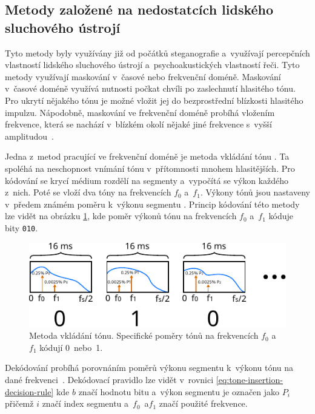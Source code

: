 \subsection*{Metody založené na nedostatcích lidského sluchového ústrojí}
\label{sub:has}

Tyto metody byly využívány již od počátků steganografie a~využívají percepčních
vlastností lidského sluchového ústrojí a~psychoakustických vlastností řeči.
Tyto metody využívají maskování v~časové nebo frekvenční doméně. Maskování
v~časové doméně využívá nutnosti počkat chvíli po zaslechnutí hlasitého tónu.
Pro ukrytí nějakého tónu je možné vložit jej do bezprostřední blízkosti
hlasitého impulzu. Nápodobně, maskování ve frekvenční doméně probíhá vložením
frekvence, která se nachází v~blízkém okolí nějaké jiné frekvence s~vyšší
amplitudou~\cite{Dutta2020}.

Jedna z~metod pracující ve frekvenční doméně je metoda vkládání tónu
\cite{Dutta2020}. Ta spoléhá na neschopnost vnímání tónu v~přítomnosti mnohem
hlasitějších. Pro kódování se krycí médium rozdělí na segmenty a~vypočítá se
výkon každého z~nich. Poté se vloží dva tóny na frekvencích $f_0$ a~$f_1$.
Výkony tónů jsou nastaveny v~předem známém poměru k~výkonu segmentu
\cite{Djebbar2012}. Princip kódování této metody lze vidět na obrázku
\ref{pic:tone-insertion}, kde poměr výkonů tónu na frekvencích $f_0$ a~$f_1$
kóduje bity \texttt{010}.

\begin{figure}[hbt]
    \centering
    \includegraphics[width=\textwidth]{obrazky/tone-insertion-diagram.pdf}
    \caption{Metoda vkládání tónu. Specifické poměry tónů na frekvencích $f_0$
    a~$f_1$ kódují 0~nebo~1.}
    \label{pic:tone-insertion}
\end{figure}

Dekódování probíhá porovnáním poměrů výkonu segmentu k~výkonu tónu na dané
frekvenci~\cite{Djebbar2012}. Dekódovací pravidlo lze vidět v~rovnici
\ref{eq:tone-insertion-decision-rule} kde $b$ značí hodnotu bitu a~výkon
segmentu je označen jako $P_i$ přičemž $i$ značí index segmentu a~$f_0$~a$f_1$
značí použité frekvence.

